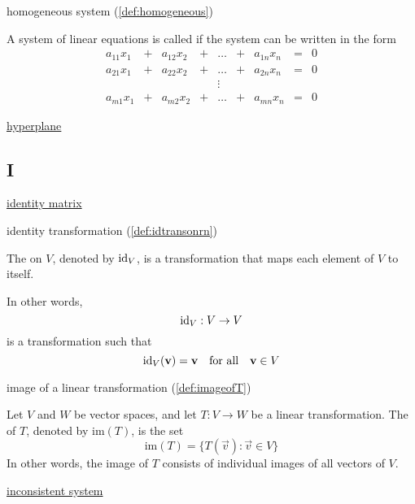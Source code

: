 \documentclass{ximera}
\begin{document}

homogeneous system (\ref{def:homogeneous})
\begin{expandable}
    A system of linear equations is called  if the system can be written in the form
$$\begin{array}{ccccccccc}
      a_{11}x_1 &+ &a_{12}x_2&+&\ldots&+&a_{1n}x_n&= &0 \\
	 a_{21}x_1 &+ &a_{22}x_2&+&\ldots&+&a_{2n}x_n&= &0 \\
     &&&&\vdots&&&& \\
     a_{m1}x_1 &+ &a_{m2}x_2&+&\ldots&+&a_{mn}x_n&= &0
    \end{array}$$
\end{expandable}

\href{https://ximera.osu.edu/oerlinalg/LinearAlgebra/RRN-0030/main}{hyperplane}

\subsection{I}

\href{https://ximera.osu.edu/oerlinalg/LinearAlgebra/MAT-0020/main}{identity matrix}

identity transformation (\ref{def:idtransonrn})
\begin{expandable}
    The  on $V$, denoted by $\text{id}_V$, is a transformation that maps each element of $V$ to itself.

In other words,
$$\text{id}_V:V\rightarrow V$$ is a transformation such that $$\text{id}_V(\mathbf{v})=\mathbf{v}\quad\text{for all}\quad \mathbf{v} \in V$$
\end{expandable}

image of a linear transformation (\ref{def:imageofT})
\begin{expandable}
    Let $V$ and $W$ be vector spaces, and let $T:V\rightarrow W$ be a linear transformation.  The  of $T$, denoted by $\mbox{im}(T)$, is the set
$$\mbox{im}(T)=\{T(\vec{v}):\vec{v}\in V\}$$
In other words, the image of $T$ consists of individual images of all vectors of $V$.
\end{expandable}

\href{https://ximera.osu.edu/oerlinalg/LinearAlgebra/SYS-0010/main}{inconsistent system}
\end{document}
